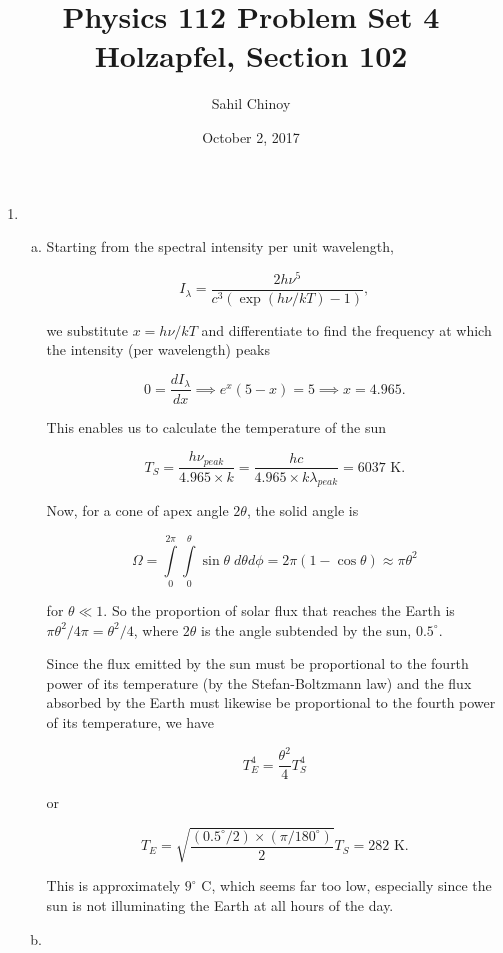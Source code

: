 \documentclass{article}
\title{Physics 112 Problem Set 4 \\ \large{Holzapfel, Section 102}}
\author{Sahil Chinoy}
\date{October 2, 2017}
\begin{document}
\maketitle{}

\begin{enumerate}

	\item 

	\begin{enumerate}[(a)]

		\item

		Starting from the spectral intensity per unit wavelength,

		$$I_\lambda = \frac{2 h \nu^5}{c^3 (\exp(h\nu / kT) - 1)},$$

		we substitute $x = h \nu / kT$ and differentiate to find the frequency at which the intensity (per wavelength) peaks

		$$0 = \frac{d I_\lambda}{d x} \implies e^x(5-x) = 5 \implies x = 4.965.$$

		This enables us to calculate the temperature of the sun

		$$T_S = \frac{h \nu_{peak}}{4.965 \times k} =  \frac{hc}{4.965 \times k \lambda_{peak}} = 6037 \text{ K.}$$

		Now, for a cone of apex angle $2\theta$, the solid angle is

		$$\Omega = \int \limits_0^{2\pi} \int \limits_0^\theta \sin \theta \; d\theta d\phi = 2\pi (1-\cos\theta) \approx \pi \theta^2$$

		for $\theta \ll 1$. So the proportion of solar flux that reaches the Earth is $\pi \theta^2 / 4 \pi = \theta^2 / 4$, where $2\theta$ is the angle subtended by the sun, $0.5^\circ$.

		Since the flux emitted by the sun must be proportional to the fourth power of its temperature (by the Stefan-Boltzmann law) and the flux absorbed by the Earth must likewise be proportional to the fourth power of its temperature, we have

		$$T_E^4 = \frac{\theta^2}{4} T_S^4$$

		or

		$$T_E = \sqrt{\frac{(0.5^\circ / 2) \times (\pi / 180^\circ)}{2}} T_S = 282 \text{ K.}$$

		This is approximately $9^\circ$ C, which seems far too low, especially since the sun is not illuminating the Earth at all hours of the day.

		\item


\end{enumerate}
\end{enumerate}
\end{document}
